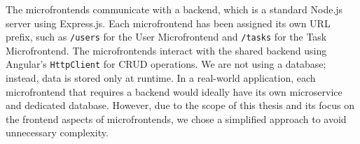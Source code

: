The microfrontends communicate with a backend, which is a standard Node.js server using Express.js. Each microfrontend has been assigned its own URL prefix, such as \texttt{/users} for the User Microfrontend and \texttt{/tasks} for the Task Microfrontend. The microfrontends interact with the shared backend using Angular's \texttt{HttpClient} for CRUD operations. We are not using a database; instead, data is stored only at runtime. In a real-world application, each microfrontend that requires a backend would ideally have its own microservice and dedicated database. However, due to the scope of this thesis and its focus on the frontend aspects of microfrontends, we chose a simplified approach to avoid unnecessary complexity.